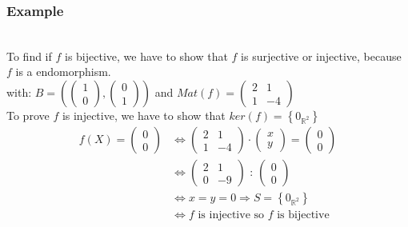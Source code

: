 \documentclass[notitlepage]{math}
\begin{document}
\subsubsection{Example}
\\
To find if $f$ is bijective, we have to show that $f$ is surjective or injective, because $f$ is a endomorphism. \\
with: $B = \left(\begin{pmatrix} 1 \\ 0 \end{pmatrix}, \begin{pmatrix} 0 \\ 1 \end{pmatrix}\right)$ 
and $Mat(f) = \begin{pmatrix} 2 & 1 \\
        1 & -4
    \end{pmatrix}$ \\
To prove $f$ is injective, we have to show that $ker (f) = \left\{ 0_{\mathbb{R}^2} \right\}$
\begin{align*}   
    f(X)  = \begin{pmatrix} 0 \\ 0 \end{pmatrix} &\Longleftrightarrow \begin{pmatrix} 2 & 1 \\
        1 & -4
    \end{pmatrix} \cdot \begin{pmatrix} x \\ y \end{pmatrix} = \begin{pmatrix} 0 \\ 0 \end{pmatrix} \\
    &\Longleftrightarrow
    \begin{pmatrix}
        2 & 1 \\
        0 & -9
    \end{pmatrix} \text{ : } \begin{pmatrix} 0 \\ 0 \end{pmatrix} \\
    &\Longleftrightarrow x = y = 0 \Rightarrow S = \left\{ 0_{\mathbb{R}^2} \right\} \\ 
    &\Leftrightarrow f \text{ is injective so } f \text{ is bijective}
\end{align*}
\end{document}
